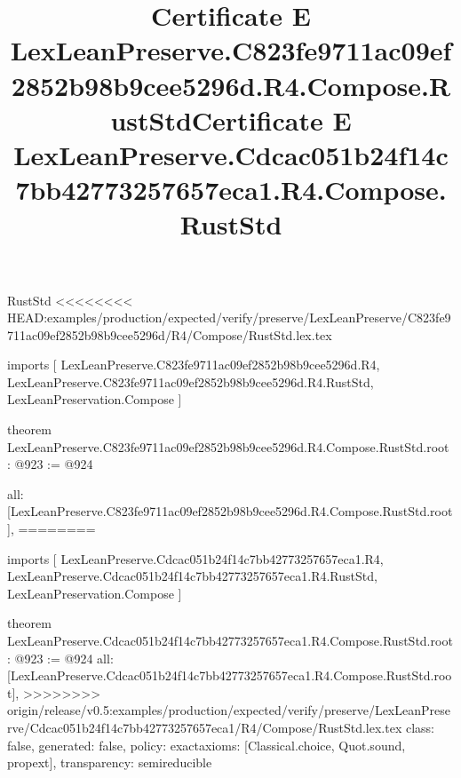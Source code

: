 \begin{lexlean}{RustStd}
<<<<<<<< HEAD:examples/production/expected/verify/preserve/LexLeanPreserve/C823fe9711ac09ef2852b98b9cee5296d/R4/Compose/RustStd.lex.tex
\title{Certificate E LexLeanPreserve.C823fe9711ac09ef2852b98b9cee5296d.R4.Compose.RustStd}
\begin{coremodule}
imports [
  LexLeanPreserve.C823fe9711ac09ef2852b98b9cee5296d.R4,
  LexLeanPreserve.C823fe9711ac09ef2852b98b9cee5296d.R4.RustStd,
  LexLeanPreservation.Compose
]

theorem LexLeanPreserve.C823fe9711ac09ef2852b98b9cee5296d.R4.Compose.RustStd.root : @923 := @924 {
  all: [LexLeanPreserve.C823fe9711ac09ef2852b98b9cee5296d.R4.Compose.RustStd.root],
========
\title{Certificate E LexLeanPreserve.Cdcac051b24f14c7bb42773257657eca1.R4.Compose.RustStd}
\begin{coremodule}
imports [
  LexLeanPreserve.Cdcac051b24f14c7bb42773257657eca1.R4,
  LexLeanPreserve.Cdcac051b24f14c7bb42773257657eca1.R4.RustStd,
  LexLeanPreservation.Compose
]

theorem LexLeanPreserve.Cdcac051b24f14c7bb42773257657eca1.R4.Compose.RustStd.root : @923 := @924 {
  all: [LexLeanPreserve.Cdcac051b24f14c7bb42773257657eca1.R4.Compose.RustStd.root],
>>>>>>>> origin/release/v0.5:examples/production/expected/verify/preserve/LexLeanPreserve/Cdcac051b24f14c7bb42773257657eca1/R4/Compose/RustStd.lex.tex
  class: false,
  generated: false,
  policy: exact{axioms: [Classical.choice, Quot.sound, propext]},
  transparency: semireducible
}


\end{coremodule}}
\end{coremodule}
\end{lexlean}
